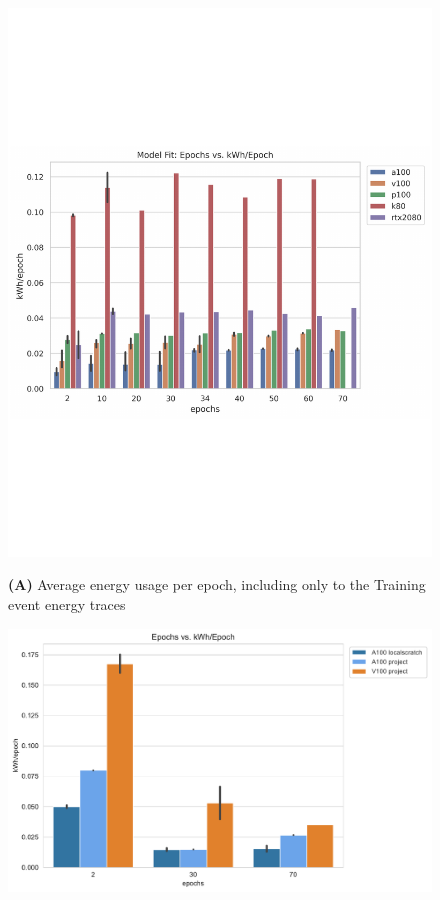 \documentclass[utf8]{FrontiersinVancouver} %
\begin{document}
\begin{figure}[htb]
{\begin{center}
       \includegraphics[height=0.28\textheight]{images/energy_all_model_fit_kWh_per_epoch}

       {\bf (A)} Average energy usage per epoch, including only to the Training event energy traces

        \includegraphics[height=0.29\textheight]{images/total_kWh_per_epoch_new}


\end{center}}
\end{figure}
\end{document}
